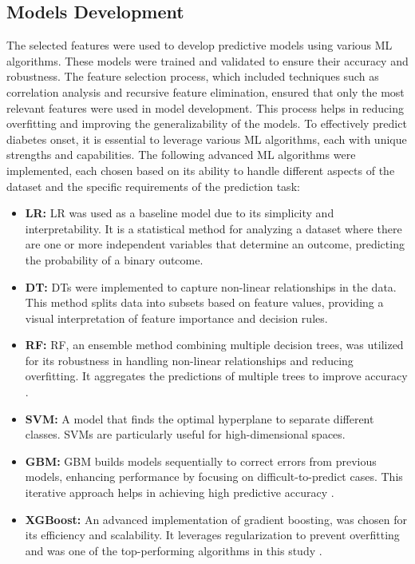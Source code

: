 \subsection{Models Development}

The selected features were used to develop predictive models using various ML algorithms. These models were trained and validated to ensure their accuracy and robustness. The feature selection process, which included techniques such as correlation analysis and recursive feature elimination, ensured that only the most relevant features were used in model development. This process helps in reducing overfitting and improving the generalizability of the models.
To effectively predict diabetes onset, it is essential to leverage various ML algorithms, each with unique strengths and capabilities. The following advanced ML algorithms were implemented, each chosen based on its ability to handle different aspects of the dataset and the specific requirements of the prediction task:

\begin{itemize}
    \item \textbf{LR:} LR was used as a baseline model due to its simplicity and interpretability. It is a statistical method for analyzing a dataset where there are one or more independent variables that determine an outcome, predicting the probability of a binary outcome.
    \item \textbf{DT:} DTs were implemented to capture non-linear relationships in the data. This method splits data into subsets based on feature values, providing a visual interpretation of feature importance and decision rules.
    \item \textbf{RF:} RF, an ensemble method combining multiple decision trees, was utilized for its robustness in handling non-linear relationships and reducing overfitting. It aggregates the predictions of multiple trees to improve accuracy \cite{Ref11}.
    \item \textbf{SVM:} A model that finds the optimal hyperplane to separate different classes. SVMs are particularly useful for high-dimensional spaces.
    \item \textbf{GBM:} GBM builds models sequentially to correct errors from previous models, enhancing performance by focusing on difficult-to-predict cases. This iterative approach helps in achieving high predictive accuracy \cite{Ref12}.
    \item \textbf{XGBoost:} An advanced implementation of gradient boosting, was chosen for its efficiency and scalability. It leverages regularization to prevent overfitting and was one of the top-performing algorithms in this study \cite{Ref13}.
\end{itemize}

